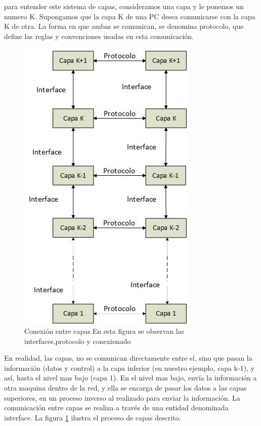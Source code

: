 para entender este sistema de capas, consideramos una capa y le ponemos un numero K. Supongamos que la capa K de una PC desea comunicarse con la capa K de otra. La forma en que ambas se comunican, se denomina protocolo, que define las reglas y convenciones usadas en esta comunicación. 

\begin{figure}
	\centering 
	\includegraphics[scale=0.6]{modcap}
	\caption{Conexión entre capas.En esta figura se observan las interfaces,protocolo y conexionado}
	\label{fig:modOSI}	
\end{figure}
En realidad, las capas, no se comunican directamente entre sí, sino que pasan la información (datos y control) a la capa inferior (en nuestro ejemplo, capa k-1), y así, hasta el nivel mas bajo (capa 1). En el nivel mas bajo, envía la información a otra maquina dentro de la red, y ella se encarga de pasar los datos a las capas superiores, en un proceso inverso al realizado para enviar la información. La comunicación entre capas se realiza a través de una entidad denominada interface. La figura  \ref{fig:modOSI} ilustra el proceso de capas descrito.

